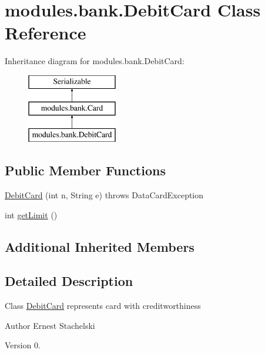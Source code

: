 \hypertarget{classmodules_1_1bank_1_1_debit_card}{}\section{modules.\+bank.\+Debit\+Card Class Reference}
\label{classmodules_1_1bank_1_1_debit_card}
Inheritance diagram for modules.\+bank.\+Debit\+Card\+:\begin{figure}[H]
\begin{center}
\leavevmode
\includegraphics[height=3.000000cm]{classmodules_1_1bank_1_1_debit_card}
\end{center}
\end{figure}
\subsection*{Public Member Functions}
\begin{DoxyCompactItemize}
\item 
\mbox{\hyperlink{classmodules_1_1bank_1_1_debit_card_a8c1e64fb14ac49e486aa8e052cb29e80}{Debit\+Card}} (int n, String e)  throws Data\+Card\+Exception 
\item 
int \mbox{\hyperlink{classmodules_1_1bank_1_1_debit_card_acf3df8280f72ad26844cb04fdb9bb3ae}{get\+Limit}} ()
\end{DoxyCompactItemize}
\subsection*{Additional Inherited Members}


\subsection{Detailed Description}
Class \mbox{\hyperlink{classmodules_1_1bank_1_1_debit_card}{Debit\+Card}} represents card with creditworthiness \begin{DoxyAuthor}{Author}
Ernest Stachelski 
\end{DoxyAuthor}
\begin{DoxyVersion}{Version}
0. 
\end{DoxyVersion}


